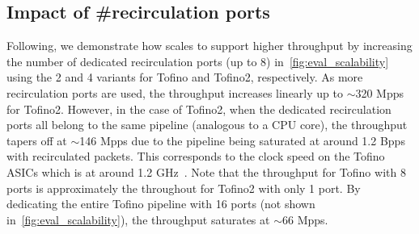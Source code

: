 


\subsection{Impact of \#recirculation ports}



Following, we demonstrate how \sysname scales to support higher throughput by increasing the number of dedicated recirculation ports (up to 8) in~\cref{fig:eval_scalability} using the 2 \pround and 4 \pround variants for Tofino and Tofino2, respectively.
As more recirculation ports are used, the throughput increases linearly up to ${\sim}$320 Mpps for Tofino2.
However, in the case of Tofino2, when the dedicated recirculation ports all belong to the same pipeline
\cite{2021-TAPOPF-PIPELINES} 
(analogous to a CPU core), the throughput tapers off at ${\sim}$146 Mpps due to the pipeline being saturated at around 1.2 Bpps~\cite{intel-tofino2-specs} with recirculated packets.
This corresponds to the clock speed on the Tofino ASICs which is at around 1.2 GHz~\cite{hotchips30-tf,intel-tofino2-specs}.
Note that the throughput for Tofino with 8 ports is approximately the throughout for Tofino2 with only 1 port.
By dedicating the entire Tofino pipeline with 16 ports (not shown in~\cref{fig:eval_scalability}), the throughput saturates at ${\sim}$66 Mpps.


